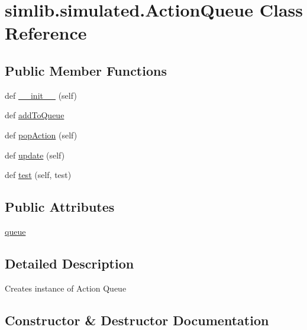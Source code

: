 \hypertarget{classsimlib_1_1simulated_1_1_action_queue}{}\section{simlib.\+simulated.\+Action\+Queue Class Reference}
\label{classsimlib_1_1simulated_1_1_action_queue}
\subsection*{Public Member Functions}
\begin{DoxyCompactItemize}
\item 
def \mbox{\hyperlink{classsimlib_1_1simulated_1_1_action_queue_aa1ba98000ab1a4224d9036678b9404d4}{\+\_\+\+\_\+init\+\_\+\+\_\+}} (self)
\item 
def \mbox{\hyperlink{classsimlib_1_1simulated_1_1_action_queue_ad3b4d3efb217b9624fb98f602b5bd86a}{add\+To\+Queue}}
\item 
def \mbox{\hyperlink{classsimlib_1_1simulated_1_1_action_queue_a7910d8cb9b8a6c40fb86a39390c76d17}{pop\+Action}} (self)
\item 
def \mbox{\hyperlink{classsimlib_1_1simulated_1_1_action_queue_a81ac500fc4a41ee0fd8e75b2daa3269f}{update}} (self)
\item 
def \mbox{\hyperlink{classsimlib_1_1simulated_1_1_action_queue_a4acc91e65e6844b9241436593bcb68c2}{test}} (self, test)
\end{DoxyCompactItemize}
\subsection*{Public Attributes}
\begin{DoxyCompactItemize}
\item 
\mbox{\hyperlink{classsimlib_1_1simulated_1_1_action_queue_ad16b72be1173c076a377ad76b105616d}{queue}}
\end{DoxyCompactItemize}


\subsection{Detailed Description}
\begin{DoxyVerb}Creates instance of Action Queue
\end{DoxyVerb}
 

\subsection{Constructor \& Destructor Documentation}
\mbox{\label{classsimlib_1_1simulated_1_1_action_queue_aa1ba98000ab1a4224d9036678b9404d4}} 
